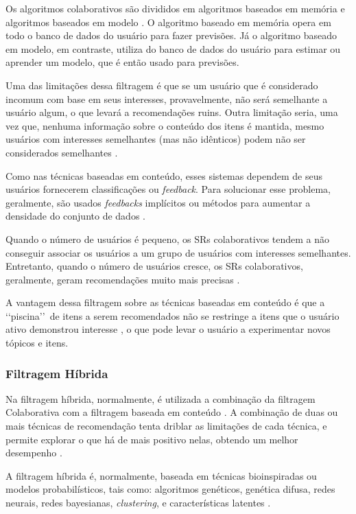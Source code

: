Os algoritmos colaborativos são divididos em algoritmos baseados em memória e algoritmos baseados em 
modelo \cite{breese2013}. O algoritmo baseado em memória opera em todo o banco de dados do usuário para fazer 
previsões. Já o algoritmo baseado em modelo, em contraste, utiliza do banco de dados do usuário 
para estimar ou aprender um modelo, que é então usado para previsões.

Uma das limitações dessa filtragem é que se um usuário que é considerado incomum com base em seus 
interesses, provavelmente, não será semelhante a usuário algum,
o que levará a recomendações ruins. Outra limitação seria, uma vez que, nenhuma informação sobre o 
conteúdo dos itens é mantida, mesmo usuários com interesses semelhantes (mas não 
idênticos) podem não ser considerados semelhantes \cite{son2017}.

Como nas técnicas baseadas em conteúdo, esses sistemas dependem de seus usuários fornecerem classificações ou \emph{feedback}. Para solucionar 
esse problema, geralmente, são usados \emph{feedbacks} implícitos ou métodos para aumentar 
a densidade do conjunto de dados \cite{paulson2003}.

Quando o número de usuários é pequeno, os SRs colaborativos tendem a não conseguir associar 
os usuários a um grupo de usuários com interesses semelhantes. Entretanto, quando o 
número de usuários cresce, os SRs colaborativos, geralmente, geram recomendações muito mais 
precisas \cite{mauricio}. 

A vantagem dessa filtragem sobre as técnicas baseadas em conteúdo é que a \lq\lq piscina\rq\rq\  de itens a serem recomendados 
não se restringe a itens que o usuário ativo demonstrou interesse \cite{paulson2003}, o que pode levar o usuário a experimentar novos tópicos e itens.


\subsubsection{Filtragem Híbrida}

Na filtragem híbrida, normalmente, é utilizada a combinação da filtragem Colaborativa com a filtragem 
baseada em conteúdo \cite{bobadilla2013}. A combinação de duas ou mais técnicas de recomendação tenta driblar as limitações de cada 
técnica, e permite explorar o que há de mais positivo nelas, obtendo um melhor desempenho \cite{burke2002}. 

A filtragem híbrida é, normalmente, baseada em técnicas bioinspiradas ou modelos probabilísticos, tais como: 
algoritmos genéticos, genética difusa, redes neurais, redes bayesianas, \emph{clustering}, e características latentes  \cite{bobadilla2013}.


